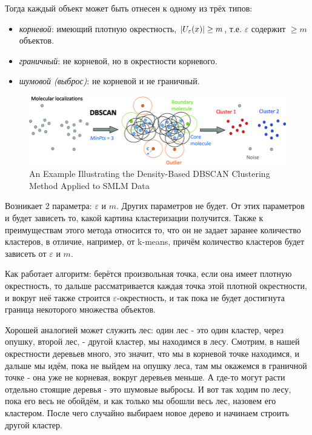 Тогда каждый объект может быть отнесен к одному из трёх типов:
\begin{itemize}
    \item \textit{корневой}: имеющий плотную окрестность,  {$\left|U_\varepsilon (x)\right| \geq m$}, т.е. $\varepsilon$ содержит $\geq m$ объектов.
    \item \textit{граничный}: не корневой, но в окрестности корневого.
    \item \textit{шумовой (выброс)}: не корневой и не граничный.
\end{itemize}
\begin{figure}[h!]
    \centering
    \includegraphics[width=0.9\linewidth]{chapters/clustering/png/An-Example-Illustrating-the-Density-Based-DBSCAN-Clustering-Method-Applied-to-SMLM-Data.png}
    \caption{An Example Illustrating the Density-Based DBSCAN Clustering Method Applied to SMLM Data}
    \label{fig:enter-label-2}
\end{figure}
Возникает 2 параметра: $\varepsilon$ и $m$. Других параметров не будет. От этих параметров и будет зависеть то, какой картина кластеризации получится. Также к преимуществам этого метода относится то, что он не задает заранее количество кластеров, в отличие, например, от k-means, причём количество кластеров будет зависеть от $\varepsilon$ и $m$. 

Как работает алгоритм: берётся произвольная точка, если она имеет плотную окрестность, то дальше рассматривается каждая точка этой плотной окрестности, и вокруг неё также строится $\varepsilon$-окрестность, и так пока не будет достигнута граница некоторого множества объектов. 

Хорошей аналогией может служить лес: один лес - это один кластер, через опушку, второй лес, - другой кластер, мы находимся в лесу. Смотрим, в нашей окрестности деревьев много, это значит, что мы в корневой точке находимся, и дальше мы идём, пока не выйдем на опушку леса, там мы окажемся в граничной точке - она уже не корневая, вокруг деревьев меньше. А где-то могут расти отдельно стоящие деревья - это шумовые выбросы. И вот так ходим по лесу, пока его весь не обойдём, и как только мы обошли весь лес, назовем его кластером. После чего случайно выбираем новое дерево и начинаем строить другой кластер.

